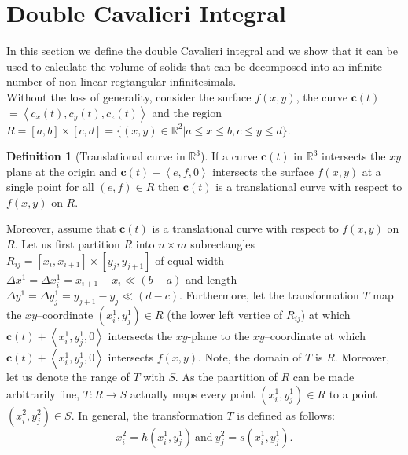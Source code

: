 \documentclass{article}
\theoremstyle{theorem}
\theoremstyle{definition}
\newtheorem*{definition}{Definition}
\begin{document}
\section{Double Cavalieri Integral}
In this section we define the double Cavalieri integral and we show that it can be used to calculate the volume of solids that can be decomposed into an infinite 
number of non-linear regtangular infinitesimals.\\

\noindent
Without the loss of generality, consider the surface $f(x,y)$, the curve $\mathbf{c}(t)$\\$=\left <c_x(t),c_y(t), c_z(t) \right >$ and the region $R = [a,b]\times [c,d] = \{(x,y)\in \mathbb{R}^2|a \leq x \leq b, c \leq y \leq d\}$.

\begin{definition}[Translational curve in $\mathbb{R}^3$]
If a curve $\mathbf{c}(t)$ in $\mathbb{R}^3$ intersects the $xy$ plane at the origin and $\mathbf{c}(t) + \left < e,f,0 \right >$ intersects 
the surface $f(x,y)$ at a single point for all $(e,f)\in R$ then $\mathbf{c}(t)$ is a translational curve 
with respect to $f(x,y)$ on $R$. 
\end{definition}

\noindent
Moreover, assume that $\mathbf{c}(t)$ is a translational curve with respect to $f(x,y)$ on $R$. Let us first partition $R$ into $n\times m$ subrectangles $R_{ij} = [x_{i},x_{i+1}] \times [y_{j},y_{j+1}]$ of equal width $\Delta x^1 = \Delta x_i^1 = x_{i+1}-x_i\ll (b-a)$ and length $\Delta y^1= \Delta y_j^1 = y_{j+1}-y_j\ll(d-c)$.
Furthermore, let the transformation $T$ map the $xy$--coordinate $(x_i^1,y_j^1)\in R$ (the lower left vertice of $R_{ij}$) at which $\mathbf{c}(t) + \left <x_i^1,y_j^1,0 \right >$ intersects the 
$xy$-plane to the $xy$--coordinate at which $\mathbf{c}(t) + \left <x_i^1,y_j^1,0 \right >$ intersects $f(x,y)$. Note, the domain of $T$ is $R$. Moreover, let us denote the range 
of $T$ with $S$. As the paartition of $R$ can be made arbitrarily fine, $T:R\rightarrow S$ actually maps every point $(x_i^1,y_j^1)\in R$ to a point $(x_i^2,y_j^2)\in S$. In general, the transformation $T$ is defined as follows:
\begin{equation}
x_i^2 = h(x_i^1,y_j^1)~\textrm{and}~y_j^2 = s(x_i^1,y_j^1).
\end{equation}



\end{document}
